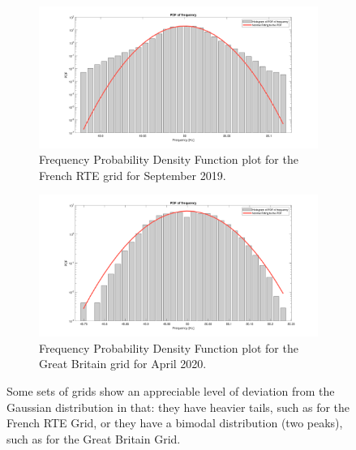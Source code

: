 \begin{figure}[!ht]
	\centering
	\begin{subfigure}{\textwidth}
		\centering
		\includegraphics[scale=0.25]{../figures/pdf/pdf_frequency_rte_2019_09}
		\caption{Frequency Probability Density Function plot for the French RTE grid for September 2019.}
	\end{subfigure}
	
	\begin{subfigure}{\textwidth}
		\centering
		\includegraphics[scale=0.25]{../figures/pdf/pdf_frequency_uk_2020_04}
		\caption{Frequency Probability Density Function plot for the Great Britain grid for April 2020.}
	\end{subfigure}

	\caption{Some sets of grids show an appreciable level of deviation from the Gaussian distribution in that: they have heavier tails, such as for the French RTE Grid, or they have a bimodal distribution (two peaks), such as for the Great Britain Grid.}
\end{figure}


